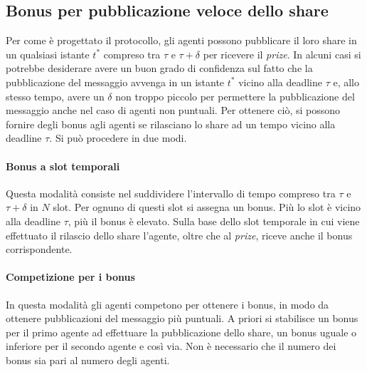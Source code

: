 \subsection{Bonus per pubblicazione veloce dello share}
Per come è progettato il protocollo, gli agenti possono pubblicare il loro share in un qualsiasi istante
$ t^* $ compreso tra 
$ \tau $ e $ \tau + \delta $ per ricevere il \textit{prize}. In alcuni casi si potrebbe desiderare avere  un buon grado di confidenza sul fatto che la pubblicazione del messaggio avvenga in un istante $ t^* $ vicino alla deadline $ \tau $ e, allo stesso tempo, avere un $ \delta $ non troppo piccolo per permettere la pubblicazione del messaggio anche nel caso di agenti non puntuali. Per ottenere ciò, si possono fornire degli bonus agli agenti se rilasciano lo share ad un tempo vicino alla
deadline $ \tau $. Si può procedere in due modi.
\paragraph{Bonus a slot temporali} Questa modalità consiste nel suddividere l'intervallo di tempo compreso tra $ \tau $ e $ \tau + \delta $ in $ N $ slot. Per ognuno di questi slot si assegna un bonus. Più lo slot
è vicino alla deadline $ \tau $, più il bonus è elevato. Sulla base dello slot temporale in cui viene effettuato il rilascio dello share l'agente, oltre che al \textit{prize}, riceve anche il bonus corrispondente.
\paragraph{Competizione per i bonus} In questa modalità gli agenti competono per ottenere i bonus, in modo da ottenere pubblicazioni del messaggio più puntuali. A priori si stabilisce un bonus per il primo agente ad effettuare la pubblicazione dello share, un bonus uguale o inferiore per il secondo agente e così via.
Non è necessario che il numero dei bonus sia pari al numero degli agenti.
